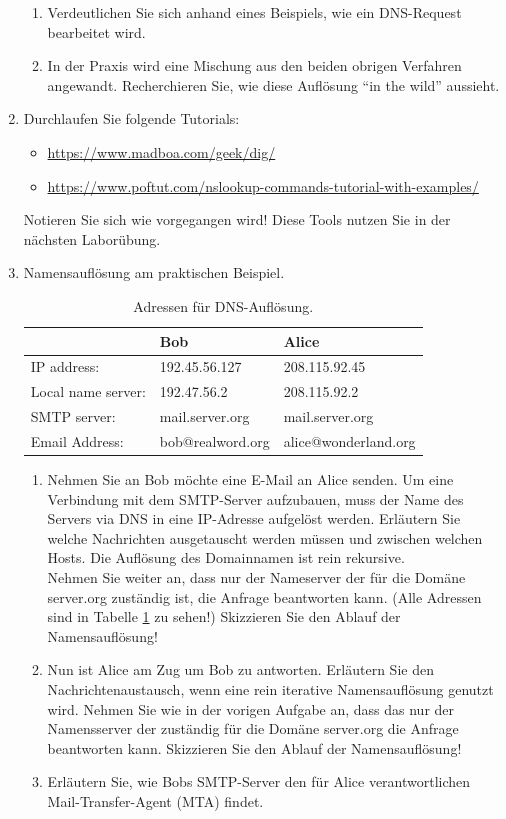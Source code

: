 \documentclass[paper=a4,fontsize=11pt]{scrartcl}%
\numberwithin{equation}{section}
\begin{document}
\begin{enumerate}
\begin{enumerate}
		\item Verdeutlichen Sie sich anhand eines Beispiels, wie ein DNS-Request bearbeitet wird.
		\item In der Praxis wird eine Mischung aus den beiden obrigen Verfahren angewandt. Recherchieren Sie, wie diese Auflösung \enquote{in the wild} aussieht.
	\end{enumerate}
	\item Durchlaufen Sie folgende Tutorials:
	\begin{itemize}
	\item \url{https://www.madboa.com/geek/dig/}
	\item \url{https://www.poftut.com/nslookup-commands-tutorial-with-examples/}
	\end{itemize}
	Notieren Sie sich wie vorgegangen wird! Diese Tools nutzen Sie in der nächsten Laborübung.	
\item Namensauflösung am praktischen Beispiel.
\begin{table}[h]
\caption{Adressen für DNS-Auflösung.}
\label{dns_mail}
\centering
\begin{tabular}{lll}
\hline
 & Bob & Alice \\ \hline
 IP address: &  192.45.56.127 & 208.115.92.45\\
 Local name server:& 192.47.56.2 & 208.115.92.2\\
 SMTP server: & mail.server.org & mail.server.org\\
 Email Address: & bob@realword.org & alice@wonderland.org\\ \hline
\end{tabular}
\end{table}
	\begin{enumerate}
		\item Nehmen Sie an Bob möchte eine E-Mail an Alice senden. Um eine Verbindung mit dem SMTP-Server aufzubauen, muss der Name des Servers via DNS in eine IP-Adresse aufgelöst werden. Erläutern Sie welche Nachrichten ausgetauscht werden müssen und zwischen welchen Hosts. Die Auflösung des Domainnamen ist rein rekursive.\\
		Nehmen Sie weiter an, dass nur der Nameserver der für die Domäne server.org zuständig ist, die Anfrage beantworten kann. (Alle Adressen sind in Tabelle \ref{dns_mail} zu sehen!) Skizzieren Sie den Ablauf der Namensauflösung!
		\item Nun ist Alice am Zug um Bob zu antworten. Erläutern Sie den Nachrichtenaustausch, wenn eine rein iterative Namensauflösung genutzt wird. Nehmen Sie wie in der vorigen Aufgabe an, dass das nur der Namensserver der zuständig für die Domäne server.org die Anfrage beantworten kann. Skizzieren Sie den Ablauf der Namensauflösung!
		\item Erläutern Sie, wie Bobs SMTP-Server den für Alice verantwortlichen Mail-Transfer-Agent (MTA) findet.
	\end{enumerate}	
\end{enumerate}
\end{document}
